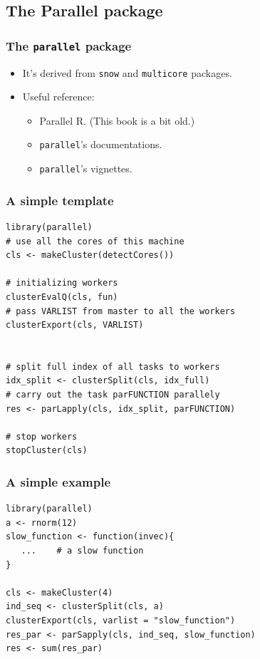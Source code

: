 \documentclass[aspectratio=169,xcolor={dvipsnames,table}]{beamer}
\begin{document}
\subsection{The Parallel package}

\begin{frame}
  \frametitle{The \texttt{parallel} package}
  \begin{itemize}
  \item It's derived from \texttt{snow} and \texttt{multicore} packages.
  \item Useful reference:
    \begin{itemize}
    \item Parallel R. (This book is a bit old.)
    \item  \texttt{parallel}'s documentations.
    \item  \texttt{parallel}'s vignettes.
    \end{itemize}
  \end{itemize}
\end{frame}

\begin{frame}[fragile]
  \frametitle{A simple template}
  \begin{block}{}
    \footnotesize
\begin{verbatim}
library(parallel)
# use all the cores of this machine
cls <- makeCluster(detectCores())

# initializing workers
clusterEvalQ(cls, fun)
# pass VARLIST from master to all the workers
clusterExport(cls, VARLIST)


# split full index of all tasks to workers
idx_split <- clusterSplit(cls, idx_full)    
# carry out the task parFUNCTION parallely
res <- parLapply(cls, idx_split, parFUNCTION)

# stop workers
stopCluster(cls)
\end{verbatim}
  \end{block}
\end{frame}

\begin{frame}[fragile]
  \frametitle{A simple example}
  \begin{block}{}
\begin{verbatim}
library(parallel)
a <- rnorm(12)
slow_function <- function(invec){
   ...    # a slow function
}

cls <- makeCluster(4)
ind_seq <- clusterSplit(cls, a)
clusterExport(cls, varlist = "slow_function")
res_par <- parSapply(cls, ind_seq, slow_function)
res <- sum(res_par)
\end{verbatim}
  \end{block}
\end{frame}
\end{document}
